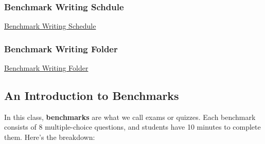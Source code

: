 \documentclass[
]{article}
\begin{document}
\hypertarget{benchmark-writing-schdule}{%
\subsubsection{Benchmark Writing Schdule}\label{benchmark-writing-schdule}}

\href{https://docs.google.com/spreadsheets/d/1hingHbcfSHpUr1Km8NF4nnrDgw5ivD6b/edit?gid=602524248\#gid=602524248}{Benchmark Writing Schedule}

\hypertarget{benchmark-writing-folder}{%
\subsubsection{Benchmark Writing Folder}\label{benchmark-writing-folder}}

\href{https://drive.google.com/drive/folders/1TBohqmI-Khge4n4NfeWAjVi5rFwVx2D6?usp=drive_link}{Benchmark Writing Folder}

\hypertarget{an-introduction-to-benchmarks}{%
\subsection{An Introduction to Benchmarks}\label{an-introduction-to-benchmarks}}

In this class, \textbf{benchmarks} are what we call exams or quizzes. Each benchmark consists of 8 multiple-choice questions, and students have 10 minutes to complete them. Here's the breakdown:
\end{document}
